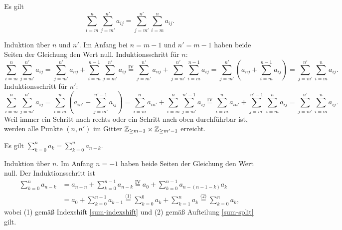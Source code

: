 \begin{Korollar} Es gilt
\[\sum_{i=m}^n \sum_{j=m'}^{n'} a_{ij} = \sum_{j=m'}^{n'}\sum_{i=m}^n a_{ij}.\]
\end{Korollar}
\begin{Beweis}
Induktion über $n$ und $n'$. Im Anfang bei $n=m-1$ und $n'=m-1$
haben beide Seiten der Gleichung den Wert null. Induktionsschritt für $n$:
\[\sum_{i=m}^n\sum_{j=m'}^{n'} a_{ij}
= \!\!\sum_{j=m'}^{n'} a_{nj}
+ \!\sum_{i=m}^{n-1}\sum_{j=m'}^{n'} a_{ij}
\stackrel{\mathrm{IV}}=
\!\sum_{j=m'}^{n'} a_{nj}
+ \!\sum_{j=m'}^{n'}\sum_{i=m}^{n-1} a_{ij}
= \!\!\sum_{j=m'}^{n'} (a_{nj}+\sum_{i=m}^{n-1} a_{ij})
= \!\!\sum_{j=m'}^{n'} \sum_{i=m}^n a_{ij}.\]
Induktionsschritt für $n'$:
\[\sum_{i=m}^n\sum_{j=m'}^{n'} a_{ij}
= \!\!\sum_{i=m}^n (a_{in'}+\!\!\sum_{j=m'}^{n'-1}a_{ij})
= \!\!\sum_{i=m}^n a_{in'}+\!\!\sum_{i=m}^n\sum_{j=m'}^{n'-1}a_{ij}
\stackrel{\mathrm{IV}}=
\!\sum_{i=m}^n a_{in'}+\sum_{j=m'}^{n'-1}\sum_{i=m}^n a_{ij}
= \!\!\sum_{j=m'}^{n'}\sum_{i=m}^n a_{ij}.\]
Weil immer ein Schritt nach rechts oder ein Schritt nach oben durchführbar ist,
werden alle Punkte $(n,n')$ im Gitter $\mathbb Z_{\ge m-1}\times\mathbb Z_{\ge m'-1}$ erreicht.\,\qedsymbol
\end{Beweis}

\begin{Korollar}\label{sum-rev}\newlinefirst
Es gilt $\sum_{k=0}^n a_k = \sum_{k=0}^n a_{n-k}$.
\end{Korollar}
\begin{Beweis}
Induktion über $n$. Im Anfang $n=-1$ haben beide Seiten der Gleichung
den Wert null. Der Induktionsschritt ist
\begin{align*}
\sum_{k=0}^n a_{n-k} &= a_{n-n} + \sum_{k=0}^{n-1} a_{n-k}
\stackrel{\mathrm{IV}}= a_0+\sum_{k=0}^{n-1} a_{n-(n-1-k)}a_k\\
&= a_0+\sum_{k=0}^{n-1} a_{k-1}
\stackrel{\text{(1)}}= \sum_{k=0}^0 a_k+\sum_{k=1}^n a_k
\stackrel{\text{(2)}}= \sum_{k=0}^n a_k,
\end{align*}
wobei (1) gemäß Indexshift \ref{sum-indexshift} und
(2) gemäß Aufteilung \ref{sum-split} gilt.\,\qedsymbol
\end{Beweis}

